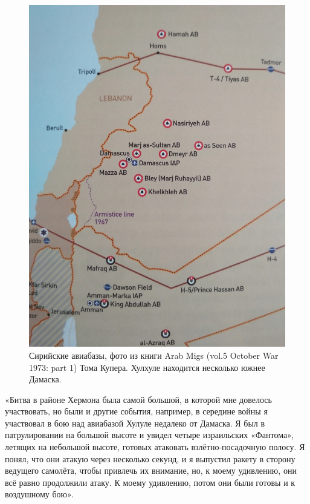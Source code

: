 \begin{figure}[h!tb] 
	\centering\includegraphics[scale=0.4]{History_Tabett/gKKUZb6lodU.jpg}
	\caption{Сирийские авиабазы, фото из книги Arab Migs (vol.5 October War 1973: part 1) Тома Купера. Хулхуле находится несколько южнее Дамаска.}%
\end{figure}

«Битва в районе Хермона была самой большой, в которой мне довелось участвовать, но были и другие события, например, в середине войны я участвовал в бою над авиабазой Хулуле недалеко от Дамаска. Я был в патрулировании на большой высоте и увидел четыре израильских «Фантома», летящих на небольшой высоте, готовых атаковать взлётно-посадочную полосу. Я понял, что они атакую через несколько секунд, и я выпустил ракету в сторону ведущего самолёта, чтобы привлечь их внимание, но, к моему удивлению, они всё равно продолжили атаку. К моему удивлению, потом они были готовы и к воздушному бою».

